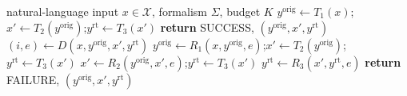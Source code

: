\documentclass[border=8pt,varwidth=15cm,12pt]{standalone}
\begin{document}
\begin{algorithmic}[1]
\REQUIRE natural-language input $x \in \mathcal{X}$, formalism $\Sigma$, budget $K$
\STATE $y^{\mathrm{orig}} \leftarrow T_1(x)$;\quad $x' \leftarrow T_2(y^{\mathrm{orig}})$;\quad $y^{\mathrm{rt}} \leftarrow T_3(x')$
        \STATE \textbf{return} SUCCESS, $(y^{\mathrm{orig}}, x', y^{\mathrm{rt}})$
    \ENDIF
    \STATE $(i, e) \leftarrow D(x, y^{\mathrm{orig}}, x', y^{\mathrm{rt}})$ 
        \STATE $y^{\mathrm{orig}} \leftarrow R_1(x, y^{\mathrm{orig}}, e)$;\quad $x' \leftarrow T_2(y^{\mathrm{orig}})$;\quad $y^{\mathrm{rt}} \leftarrow T_3(x')$
        \STATE $x' \leftarrow R_2(y^{\mathrm{orig}}, x', e)$;\quad $y^{\mathrm{rt}} \leftarrow T_3(x')$
    \ELSE
        \STATE $y^{\mathrm{rt}} \leftarrow R_3(x', y^{\mathrm{rt}}, e)$
    \ENDIF
\ENDFOR
\STATE \textbf{return} FAILURE, $(y^{\mathrm{orig}}, x', y^{\mathrm{rt}})$
\end{algorithmic}
\end{document}
